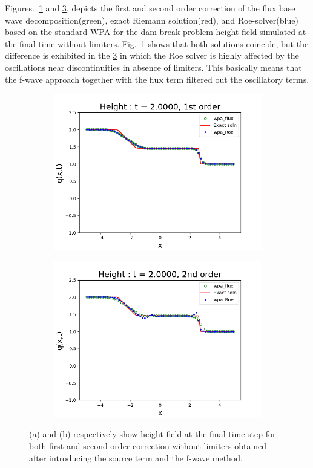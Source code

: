 \documentclass[11pt,a4paper]{article}
\begin{document}
	Figures.~\ref{fig:f1} and \ref{fig:f2}, depicts the first and second order correction of the flux base wave decomposition(green)\cite{ba-le-mi-ro:2003}, exact Riemann solution(red), and Roe-solver(blue) based on the standard WPA for the dam break problem height field simulated at the final time without limiters. Fig.~\ref{fig:f1}  shows that both solutions coincide, but the difference is exhibited in the \ref{fig:f2} in which the Roe solver is highly affected by the oscillations near discontinuities in absence of limiters. This basically means that the f-wave approach together with the flux term filtered out the oscillatory terms.
	
	\begin{figure}[H]
		\begin{subfigure}[b]{0.5\textwidth}
			\centering
			\includegraphics[width=1.0\linewidth]{images/f1}
			\caption{}
			\label{fig:f1}
		\end{subfigure}
		\begin{subfigure}[b]{0.5\textwidth}
			\centering
			\includegraphics[width=1.0\linewidth]{images/f2}
			\caption{}
			\label{fig:f2}
		\end{subfigure}
		\caption{(a) and (b) respectively show height field at the final time step for both first and second order correction without limiters obtained after introducing the source term and the f-wave method. }
	\end{figure}
	
\end{document}
